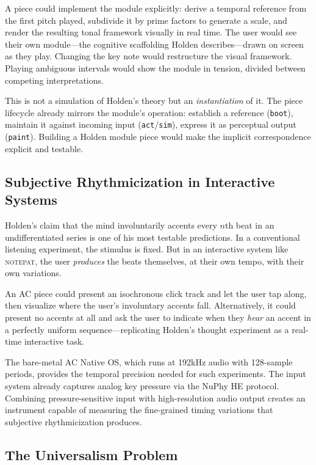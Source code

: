 \documentclass[10pt,letterpaper,twocolumn]{article}
\newcommand{\np}{\textsc{notepat}}
\begin{document}
A piece could implement the module explicitly: derive a temporal reference from the first pitch played, subdivide it by prime factors to generate a scale, and render the resulting tonal framework visually in real time. The user would see their own module---the cognitive scaffolding Holden describes---drawn on screen as they play. Changing the key note would restructure the visual framework. Playing ambiguous intervals would show the module in tension, divided between competing interpretations.

This is not a simulation of Holden's theory but an \emph{instantiation} of it. The piece lifecycle already mirrors the module's operation: establish a reference (\texttt{boot}), maintain it against incoming input (\texttt{act}/\texttt{sim}), express it as perceptual output (\texttt{paint}). Building a Holden module piece would make the implicit correspondence explicit and testable.

\subsection{Subjective Rhythmicization in Interactive Systems}

Holden's claim that the mind involuntarily accents every $n$th beat in an undifferentiated series is one of his most testable predictions. In a conventional listening experiment, the stimulus is fixed. But in an interactive system like \np{}, the user \emph{produces} the beats themselves, at their own tempo, with their own variations.

An AC piece could present an isochronous click track and let the user tap along, then visualize where the user's involuntary accents fall. Alternatively, it could present no accents at all and ask the user to indicate when they \emph{hear} an accent in a perfectly uniform sequence---replicating Holden's thought experiment as a real-time interactive task.

The bare-metal AC Native OS, which runs at 192kHz audio with 128-sample periods, provides the temporal precision needed for such experiments. The input system already captures analog key pressure via the NuPhy HE protocol. Combining pressure-sensitive input with high-resolution audio output creates an instrument capable of measuring the fine-grained timing variations that subjective rhythmicization produces.

\subsection{The Universalism Problem}
\end{document}
